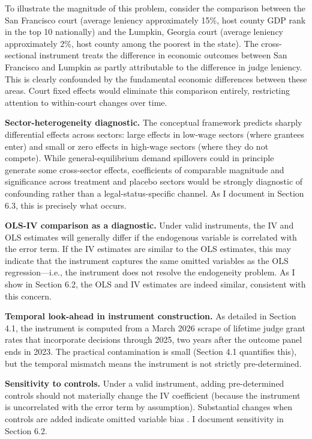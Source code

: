 \documentclass[12pt]{article}
\begin{document}
To illustrate the magnitude of this problem, consider the comparison between the San Francisco court (average leniency approximately 15\%, host county GDP rank in the top 10 nationally) and the Lumpkin, Georgia court (average leniency approximately 2\%, host county among the poorest in the state). The cross-sectional instrument treats the difference in economic outcomes between San Francisco and Lumpkin as partly attributable to the difference in judge leniency. This is clearly confounded by the fundamental economic differences between these areas. Court fixed effects would eliminate this comparison entirely, restricting attention to within-court changes over time.

\textbf{Sector-heterogeneity diagnostic.} The conceptual framework predicts sharply differential effects across sectors: large effects in low-wage sectors (where grantees enter) and small or zero effects in high-wage sectors (where they do not compete). While general-equilibrium demand spillovers could in principle generate some cross-sector effects, coefficients of comparable magnitude and significance across treatment and placebo sectors would be strongly diagnostic of confounding rather than a legal-status-specific channel. As I document in Section 6.3, this is precisely what occurs.

\textbf{OLS-IV comparison as a diagnostic.} Under valid instruments, the IV and OLS estimates will generally differ if the endogenous variable is correlated with the error term. If the IV estimates are similar to the OLS estimates, this may indicate that the instrument captures the same omitted variables as the OLS regression---i.e., the instrument does not resolve the endogeneity problem. As I show in Section 6.2, the OLS and IV estimates are indeed similar, consistent with this concern.

\textbf{Temporal look-ahead in instrument construction.} As detailed in Section 4.1, the instrument is computed from a March 2026 scrape of lifetime judge grant rates that incorporate decisions through 2025, two years after the outcome panel ends in 2023. The practical contamination is small (Section 4.1 quantifies this), but the temporal mismatch means the instrument is not strictly pre-determined.

\textbf{Sensitivity to controls.} Under a valid instrument, adding pre-determined controls should not materially change the IV coefficient (because the instrument is uncorrelated with the error term by assumption). Substantial changes when controls are added indicate omitted variable bias \citep{angrist2009mostly}. I document sensitivity in Section 6.2.
\end{document}

